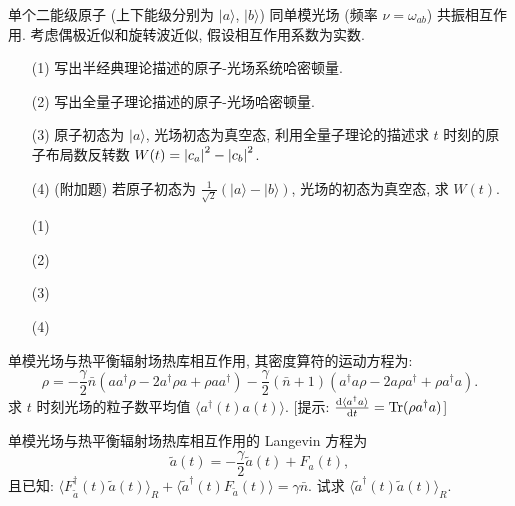 \documentclass{assignment}
\begin{document}
\begin{prob}
    单个二能级原子 (上下能级分别为 $\lvert a\rangle$, $\lvert b\rangle$) 同单模光场 (频率 $\nu=\omega_{ab}$) 共振相互作用. 考虑偶极近似和旋转波近似, 假设相互作用系数为实数.
    \begin{itemize}
        \item[(1)] 写出半经典理论描述的原子-光场系统哈密顿量.
        \item[(2)] 写出全量子理论描述的原子-光场哈密顿量.
        \item[(3)] 原子初态为 $\lvert a\rangle$, 光场初态为真空态, 利用全量子理论的描述求 $t$ 时刻的原子布局数反转数 $W(t)=\left\lvert c_a\right\rvert^2-\left\lvert c_b\right\rvert^2$.
        \item[(4)] (附加题) 若原子初态为 $\frac{1}{\sqrt{2}}(\lvert a\rangle-\lvert b\rangle)$, 光场的初态为真空态, 求 $W(t)$.
    \end{itemize}
\end{prob}
\begin{sol}
    \begin{itemize}
        \item[(1)] 
        \item[(2)] 
        \item[(3)] 
        \item[(4)] 
    \end{itemize}
\end{sol}

\begin{prob}
    单模光场与热平衡辐射场热库相互作用, 其密度算符的运动方程为:
    \[
        \rho=-\frac{\gamma}{2}\bar{n}(aa^{\dagger}\rho-2a^{\dagger}\rho a+\rho aa^{\dagger})-\frac{\gamma}{2}(\bar{n}+1)(a^{\dagger}a\rho-2a\rho a^{\dagger}+\rho a^{\dagger}a).
    \]
    求 $t$ 时刻光场的粒子数平均值 $\langle a^{\dagger}(t)a(t)\rangle$. [提示: $\frac{\mathrm{d}\langle a^{\dagger}a\rangle}{\mathrm{d}t}=\operatorname{Tr}(\rho a^{\dagger}a)$]
\end{prob}
\begin{sol}
    
\end{sol}

\begin{prob}
    单模光场与热平衡辐射场热库相互作用的 Langevin 方程为
    \[
        \tilde{a}(t)=-\frac{\gamma}{2}\tilde{a}(t)+F_a(t),
    \]
    且已知: $\langle F_{\tilde{a}}^{\dagger}(t)\tilde{a}(t)\rangle_R+\langle\tilde{a}^{\dagger}(t)F_{\tilde{a}}(t)\rangle=\gamma\bar{n}$. 试求 $\langle\tilde{a}^{\dagger}(t)\tilde{a}(t)\rangle_R$.
\end{prob}
\begin{sol}
    
\end{sol}
\end{document}
